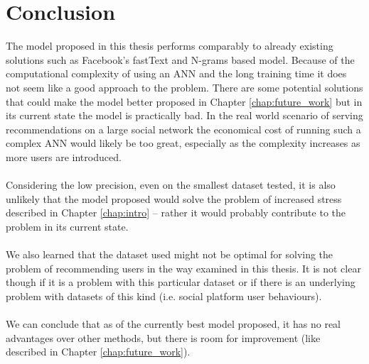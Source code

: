 \chapter{Conclusion}\label{chap:conclusion}
The model proposed in this thesis performs comparably to already existing solutions such as Facebook's fastText and N-grams based model. Because of the computational complexity of using an ANN and the long training time it does not seem like a good approach to the problem. There are some potential solutions that could make the model better proposed in Chapter \ref{chap:future_work} but in its current state the model is practically bad. In the real world scenario of serving recommendations on a large social network the economical cost of running such a complex ANN would likely be too great, especially as the complexity increases as more users are introduced.
\\\\
Considering the low precision, even on the smallest dataset tested, it is also unlikely that the model proposed would solve the problem of increased stress described in Chapter \ref{chap:intro} -- rather it would probably contribute to the problem in its current state.
\\\\
We also learned that the dataset used might not be optimal for solving the problem of recommending users in the way examined in this thesis. It is not clear though if it is a problem with this particular dataset or if there is an underlying problem with datasets of this kind (i.e. social platform user behaviours).
\\\\
We can conclude that as of the currently best model proposed, it has no real advantages over other methods, but there is room for improvement (like described in Chapter \ref{chap:future_work}).